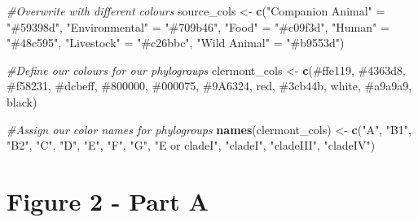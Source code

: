 \documentclass[
]{article}
\newenvironment{Shaded}{\begin{snugshade}}{\end{snugshade}}
\newcommand{\CommentTok}[1]{\textcolor[rgb]{0.56,0.35,0.01}{\textit{#1}}}
\newcommand{\FunctionTok}[1]{\textcolor[rgb]{0.13,0.29,0.53}{\textbf{#1}}}
\newcommand{\NormalTok}[1]{#1}
\newcommand{\OtherTok}[1]{\textcolor[rgb]{0.56,0.35,0.01}{#1}}
\newcommand{\StringTok}[1]{\textcolor[rgb]{0.31,0.60,0.02}{#1}}
\begin{document}
\begin{Shaded}
\begin{Highlighting}[]
\CommentTok{\#Overwrite with different colours}
\NormalTok{source\_cols }\OtherTok{\textless{}{-}} \FunctionTok{c}\NormalTok{(}\StringTok{"Companion Animal"} \OtherTok{=} \StringTok{"\#59398d"}\NormalTok{,}
         \StringTok{"Environmental"} \OtherTok{=} \StringTok{"\#709b46"}\NormalTok{,}
         \StringTok{"Food"} \OtherTok{=} \StringTok{"\#c09f3d"}\NormalTok{,}
         \StringTok{"Human"} \OtherTok{=} \StringTok{"\#48c595"}\NormalTok{,}
         \StringTok{"Livestock"} \OtherTok{=}  \StringTok{"\#c26bbc"}\NormalTok{,}
         \StringTok{"Wild Animal"} \OtherTok{=} \StringTok{"\#b9553d"}\NormalTok{)}

\CommentTok{\#Define our colours for our phylogroups}
\NormalTok{clermont\_cols }\OtherTok{\textless{}{-}} \FunctionTok{c}\NormalTok{(}\StringTok{\textquotesingle{}\#ffe119\textquotesingle{}}\NormalTok{, }\StringTok{\textquotesingle{}\#4363d8\textquotesingle{}}\NormalTok{, }\StringTok{\textquotesingle{}\#f58231\textquotesingle{}}\NormalTok{, }\StringTok{\textquotesingle{}\#dcbeff\textquotesingle{}}\NormalTok{, }\StringTok{\textquotesingle{}\#800000\textquotesingle{}}\NormalTok{, }\StringTok{\textquotesingle{}\#000075\textquotesingle{}}\NormalTok{, }\StringTok{\textquotesingle{}\#9A6324\textquotesingle{}}\NormalTok{, }\StringTok{\textquotesingle{}red\textquotesingle{}}\NormalTok{, }\StringTok{\textquotesingle{}\#3cb44b\textquotesingle{}}\NormalTok{,  }\StringTok{\textquotesingle{}white\textquotesingle{}}\NormalTok{, }\StringTok{\textquotesingle{}\#a9a9a9\textquotesingle{}}\NormalTok{, }\StringTok{\textquotesingle{}black\textquotesingle{}}\NormalTok{)}

\CommentTok{\#Assign our color names for phylogroups}
\FunctionTok{names}\NormalTok{(clermont\_cols) }\OtherTok{\textless{}{-}} \FunctionTok{c}\NormalTok{(}\StringTok{"A"}\NormalTok{, }\StringTok{"B1"}\NormalTok{,  }\StringTok{"B2"}\NormalTok{, }\StringTok{"C"}\NormalTok{, }\StringTok{"D"}\NormalTok{, }\StringTok{"E"}\NormalTok{, }\StringTok{"F"}\NormalTok{, }\StringTok{"G"}\NormalTok{, }\StringTok{"E or cladeI"}\NormalTok{, }\StringTok{"cladeI"}\NormalTok{, }\StringTok{"cladeIII"}\NormalTok{, }\StringTok{"cladeIV"}\NormalTok{)}
\end{Highlighting}
\end{Shaded}

\hypertarget{figure-2---part-a}{%
\section{Figure 2 - Part A}\label{figure-2---part-a}}
\end{document}
